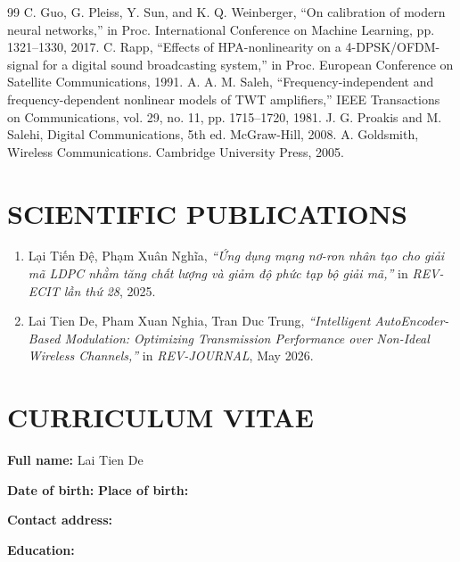 \begin{thebibliography}{99}
 C. Guo, G. Pleiss, Y. Sun, and K. Q. Weinberger, ``On calibration of modern neural networks,'' in Proc. International Conference on Machine Learning, pp. 1321--1330, 2017.
 C. Rapp, ``Effects of HPA-nonlinearity on a 4-DPSK/OFDM-signal for a digital sound broadcasting system,'' in Proc. European Conference on Satellite Communications, 1991.
 A. A. M. Saleh, ``Frequency-independent and frequency-dependent nonlinear models of TWT amplifiers,'' IEEE Transactions on Communications, vol. 29, no. 11, pp. 1715--1720, 1981.
 J. G. Proakis and M. Salehi, Digital Communications, 5th ed. McGraw-Hill, 2008.
 A. Goldsmith, Wireless Communications. Cambridge University Press, 2005.
\end{thebibliography}
\appendix
\chapter*{SCIENTIFIC PUBLICATIONS}

\begin{enumerate}[label=\arabic*., leftmargin=1.2cm, itemsep=0.35cm]
\item Lại Tiến Đệ, Phạm Xuân Nghĩa, \textit{``Ứng dụng mạng nơ-ron nhân tạo cho giải mã LDPC nhằm tăng chất lượng và giảm độ phức tạp bộ giải mã,''} in \textit{REV-ECIT lần thứ 28}, 2025.

\item Lai Tien De, Pham Xuan Nghia, Tran Duc Trung, \textit{``Intelligent AutoEncoder-Based Modulation: Optimizing Transmission Performance over Non-Ideal Wireless Channels,''} in \textit{REV-JOURNAL}, May 2026.
\end{enumerate}

\clearpage
\chapter*{CURRICULUM VITAE}

\noindent\textbf{Full name:} Lai Tien De

\noindent\textbf{Date of birth:} \dotfill \hfill \textbf{Place of birth:} \dotfill

\noindent\textbf{Contact address:} \dotfill

\vspace{0.8cm}
\noindent\textbf{Education:}

\vspace{0.4cm}
\noindent\dotfill

